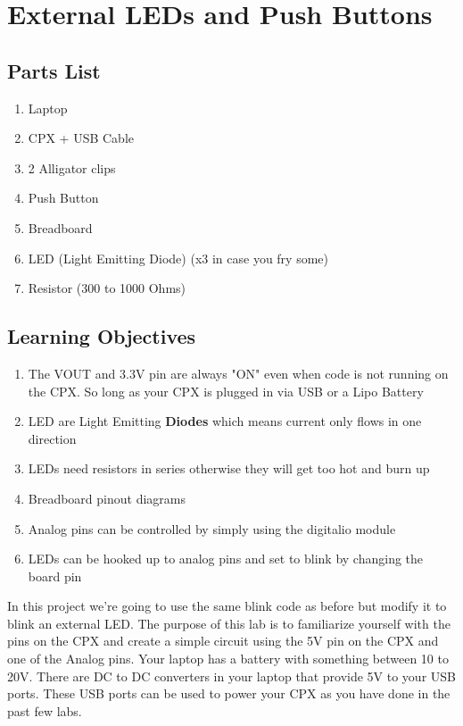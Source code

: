 \section{External LEDs and Push Buttons}

\subsection{Parts List}


\begin{enumerate}[itemsep=-5pt]
  \item Laptop
  \item CPX + USB Cable
  \item 2 Alligator clips
  \item Push Button
  \item Breadboard
  \item LED (Light Emitting Diode) (x3 in case you fry some)
  \item Resistor (300 to 1000 Ohms)
\end{enumerate}

\subsection{Learning Objectives}

\begin{enumerate}[itemsep=-5pt]
\item The VOUT and 3.3V pin are always "ON" even when code is not
  running on the CPX. So long as your CPX is plugged in via USB or a
  Lipo Battery
\item LED are Light Emitting {\bf Diodes} which means current only flows in one direction
\item LEDs need resistors in series otherwise they will get too hot and burn up
\item Breadboard pinout diagrams
\item Analog pins can be controlled by simply using the digitalio module
\item LEDs can be hooked up to analog pins and set to blink by changing the board pin
\end{enumerate}

In this project we’re going to use the same blink code as before but
modify it to blink an external LED. The purpose of this lab is to
familiarize yourself with the pins on the CPX and create a simple
circuit using the 5V pin on the CPX and one of the Analog pins. Your
laptop has a battery with something between 10 to 20V. There are DC to
DC converters in your laptop that provide 5V to your USB ports. These
USB ports can be used to power your CPX as you have done in the past
few labs.

